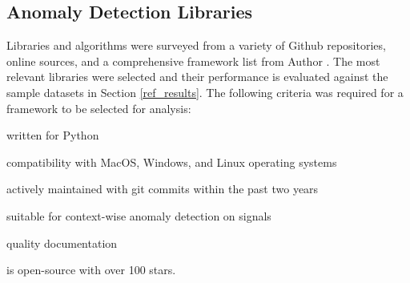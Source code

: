 






\subsection{Anomaly Detection Libraries}
\label{ref_code_libraries}
 Libraries and algorithms were surveyed from a variety of Github repositories, online sources, and a comprehensive framework list from Author \cite{medico2020-ts-list}. The most relevant libraries were selected and their performance is evaluated against the sample datasets in Section \ref{ref_results}. The following criteria was required for a framework to be selected for analysis:
 \begin{inlinelist}
     \item written for Python
     \item compatibility with MacOS, Windows, and Linux operating systems
     \item actively maintained with git commits within the past two years
     \item suitable for context-wise anomaly detection on signals
     \item quality documentation
     \item is open-source with over 100 stars.
 \end{inlinelist}
 

